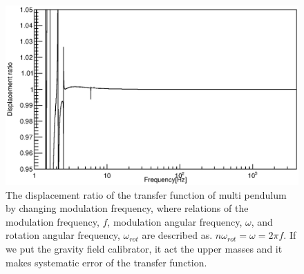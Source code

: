 \documentclass[A4]{spie}  %
\begin{document}
\begin{figure}
\begin{center}
\includegraphics[width=12cm]{dx_Gcal_ratio.eps}
\caption{The displacement ratio of the transfer function of multi pendulum by changing modulation frequency, where relations of the modulation frequency, $f$, modulation angular frequency, $\omega$, and rotation angular frequency, $\omega_{rot}$ are described as. $n\omega_{rot}=\omega=2\pi f$. If we put the gravity field calibrator, it act the upper masses and it makes systematic error of the transfer function.}
\label{fig:ratio}
\end{center}
\end{figure}
\end{document}
